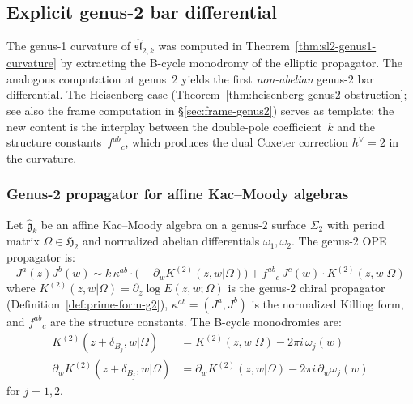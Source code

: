 \subsection{Explicit genus-2 bar differential}\label{subsec:sl2-genus2-bar}

The genus-1 curvature of $\widehat{\mathfrak{sl}}_{2,k}$ was computed in
Theorem~\ref{thm:sl2-genus1-curvature} by extracting the B-cycle
monodromy of the elliptic propagator.  The analogous
computation at genus~$2$ yields the first \emph{non-abelian} genus-$2$ bar
differential.  The Heisenberg case
(Theorem~\ref{thm:heisenberg-genus2-obstruction}; see also the
frame computation in \S\ref{sec:frame-genus2}) serves as template;
the new content is the interplay between the double-pole
coefficient~$k$ and the structure constants~$f^{ab}{}_c$, which
produces the dual Coxeter correction $h^\vee = 2$ in the curvature.

\subsubsection{Genus-2 propagator for affine Kac--Moody algebras}

\begin{proposition}
\label{prop:km-genus2-propagator}
Let $\widehat{\mathfrak{g}}_k$ be an affine Kac--Moody algebra on a
genus-$2$ surface $\Sigma_2$ with period matrix
$\Omega \in \mathfrak{H}_2$ and normalized abelian differentials
$\omega_1, \omega_2$.  The genus-$2$ OPE propagator is:
\begin{equation}\label{eq:km-genus2-ope}
J^a(z) J^b(w) \sim
  k\,\kappa^{ab} \cdot \bigl(-\partial_w K^{(2)}(z,w|\Omega)\bigr)
  + f^{ab}{}_{c}\, J^c(w) \cdot K^{(2)}(z,w|\Omega)
\end{equation}
where $K^{(2)}(z,w|\Omega) = \partial_z \log E(z,w;\Omega)$
is the genus-$2$ chiral propagator
\textup{(}Definition~\textup{\ref{def:prime-form-g2})},
$\kappa^{ab} = (J^a, J^b)$ is the normalized Killing form,
and $f^{ab}{}_c$ are the structure constants.
The B-cycle monodromies are:
\begin{align}
K^{(2)}(z + \delta_{B_j}, w|\Omega)
  &= K^{(2)}(z, w|\Omega) - 2\pi i\, \omega_j(w)
  \label{eq:km-genus2-K-mono} \\
\partial_w K^{(2)}(z + \delta_{B_j}, w|\Omega)
  &= \partial_w K^{(2)}(z, w|\Omega) - 2\pi i\, \partial_w\omega_j(w)
  \label{eq:km-genus2-dK-mono}
\end{align}
for $j = 1, 2$.
\end{proposition}


